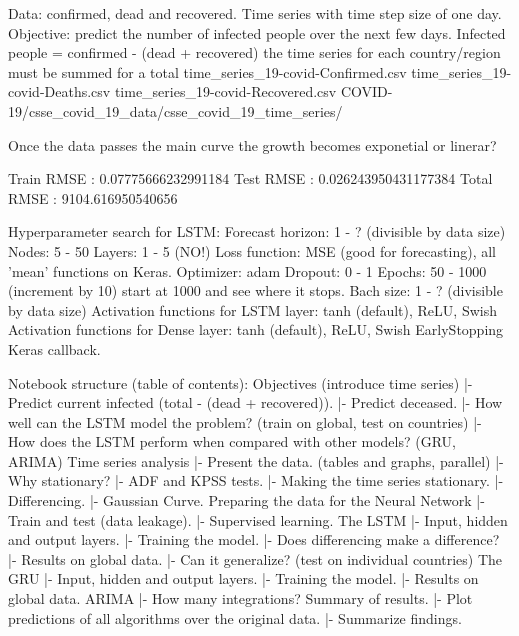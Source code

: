 Data: confirmed, dead and recovered. Time series with time step size of one day.
Objective: predict the number of infected people over the next few days.
Infected people = confirmed - (dead + recovered) {the time series for each country/region must be summed for a total}
time_series_19-covid-Confirmed.csv  time_series_19-covid-Deaths.csv  time_series_19-covid-Recovered.csv 
COVID-19/csse_covid_19_data/csse_covid_19_time_series/

Once the data passes the main curve the growth becomes exponetial or linerar?

Train RMSE : 0.07775666232991184
Test RMSE : 0.026243950431177384
Total RMSE : 9104.616950540656


Hyperparameter search for LSTM:
Forecast horizon: 1 - ? (divisible by data size)
Nodes: 5 - 50
Layers: 1 - 5 (NO!)
Loss function: MSE (good for forecasting), all 'mean' functions on Keras.
Optimizer: adam
Dropout:  0 - 1
Epochs: 50 - 1000 (increment by 10) start at 1000 and see where it stops.
Bach size: 1 - ? (divisible by data size)
Activation functions for LSTM layer: tanh (default), ReLU, Swish
Activation functions for Dense layer: tanh (default), ReLU, Swish
EarlyStopping Keras callback.

Notebook structure (table of contents):
Objectives (introduce time series)
|- Predict current infected (total - (dead + recovered)).
|- Predict deceased.
|- How well can the LSTM model the problem? (train on global, test on countries)
|- How does the LSTM perform when compared with other models? (GRU, ARIMA)
Time series analysis
|- Present the data. (tables and graphs, parallel)
|- Why stationary?
|- ADF and KPSS tests.
|- Making the time series stationary.
   |- Differencing.
   |- Gaussian Curve.
Preparing the data for the Neural Network
|- Train and test (data leakage).
|- Supervised learning.
The LSTM
|- Input, hidden and output layers.
|- Training the model. 
|- Does differencing make a difference?
|- Results on global data.
|- Can it generalize? (test on individual countries)
The GRU
|- Input, hidden and output layers.
|- Training the model. 
|- Results on global data.
ARIMA
|- How many integrations?
Summary of results.
|- Plot predictions of all algorithms over the original data.
|- Summarize findings.
